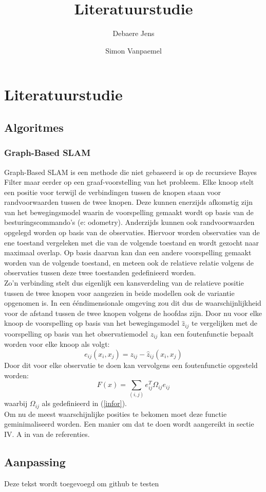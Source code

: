 \documentclass{book}
\title{Literatuurstudie}
\author{Debaere Jens \and Simon Vanpaemel}
\begin{document}
\chapter{Literatuurstudie}
\section{Algoritmes}
\subsection{Graph-Based SLAM}
Graph-Based SLAM is een methode die niet gebaseerd is op de recursieve Bayes Filter maar eerder op een graaf-voorstelling van het probleem. Elke knoop stelt een positie voor terwijl de verbindingen tussen de knopen staan voor randvoorwaarden tussen de twee knopen. Deze kunnen enerzijds afkomstig zijn van het bewegingsmodel waarin de voorspelling gemaakt wordt op basis van de besturingscommando's (e: odometry). Anderzijds kunnen ook randvoorwaarden opgelegd worden op basis van de observaties. Hiervoor worden observaties van de ene toestand vergeleken met die van de volgende toestand en wordt gezocht naar maximaal overlap. Op basis daarvan kan dan een andere voorspelling gemaakt worden van de volgende toestand, en meteen ook de relatieve relatie volgens de observaties tussen deze twee toestanden gedefinieerd worden.\\
Zo'n verbinding stelt dus eigenlijk een kansverdeling van de relatieve positie tussen de twee knopen voor aangezien in beide modellen ook de variantie opgenomen is. In een ééndimensionale omgeving zou dit dus de waarschijnlijkheid voor de afstand tussen de twee knopen volgens de hoofdas zijn. 
Door nu voor elke knoop de voorspelling op basis van het bewegingsmodel $\hat{z}_{ij}$ te vergelijken met de voorspelling op basis van het observatiemodel $z_{ij}$ kan een foutenfunctie bepaalt worden voor elke knoop als volgt:
\begin{equation}
e_{ij}(x_i,x_j) = z_{ij} - \hat{z}_{ij}(x_i,x_j)
\end{equation}
Door dit voor elke observatie te doen kan vervolgens een foutenfunctie opgesteld worden:
\begin{equation}
F(x) = \sum\limits_{(i,j)} e_{ij}^T \Omega_{ij} e_{ij}
\end{equation}
waarbij $\Omega_{ij}$ als gedefinieerd in (\ref{infor}).\\
Om nu de meest waarschijnlijke posities te bekomen moet deze functie geminimaliseerd worden. Een manier om dat te doen wordt aangereikt in sectie IV. A in \cite{graph} van de referenties.


\section{Aanpassing}
Deze tekst wordt toegevoegd om github te testen
\end{document}

